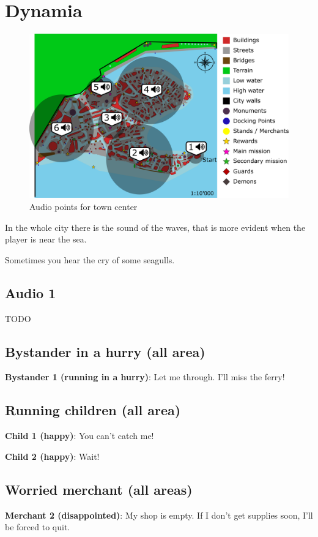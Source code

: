 \section{Dynamia}
\begin{figure}[H]
  \centering
  \includegraphics[width=\textwidth]{Images/Maps/dynamiaAudio}
  \caption{Audio points for town center}
\end{figure}

In the whole city there is the sound of the waves, that is more evident when the player is near the sea.

Sometimes you hear the cry of some seagulls.

\subsection{Audio 1}
TODO

\subsection{Bystander in a hurry (all area)}
\textbf{Bystander 1 (running in a hurry)}: Let me through. I'll miss the ferry!

\subsection{Running children (all area)}
\textbf{Child 1 (happy)}: You can't catch me!

\textbf{Child 2 (happy)}: Wait!

\subsection{Worried merchant (all areas)}
\textbf{Merchant 2 (disappointed)}: My shop is empty. If I don't get supplies soon, I'll be forced to quit.

